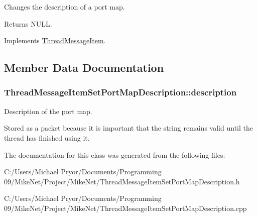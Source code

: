 Changes the description of a port map. 

\begin{DoxyReturn}{Returns}
NULL. 
\end{DoxyReturn}


Implements \hyperlink{class_thread_message_item_ae09a47834e313524b19700ebc92b0dfe}{ThreadMessageItem}.



\subsection{Member Data Documentation}
\hypertarget{class_thread_message_item_set_port_map_description_a3555b193e1583eda3c822b8c7f9d2026}{
\subsubsection[{description}]{ {\bf ThreadMessageItemSetPortMapDescription::description}}}
\label{class_thread_message_item_set_port_map_description_a3555b193e1583eda3c822b8c7f9d2026}


Description of the port map. 

Stored as a packet because it is important that the string remains valid until the thread has finished using it. 

The documentation for this class was generated from the following files:\begin{DoxyCompactItemize}
\item 
C:/Users/Michael Pryor/Documents/Programming 09/MikeNet/Project/MikeNet/ThreadMessageItemSetPortMapDescription.h\item 
C:/Users/Michael Pryor/Documents/Programming 09/MikeNet/Project/MikeNet/ThreadMessageItemSetPortMapDescription.cpp\end{DoxyCompactItemize}
